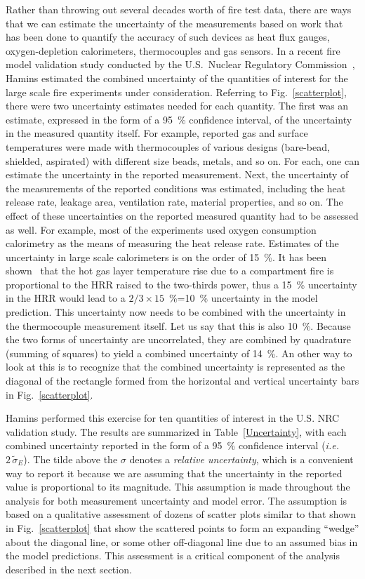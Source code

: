 Rather than throwing out several decades worth of fire test data, there are ways that we can estimate the uncertainty of the measurements based on work
that has been done to quantify the accuracy of such devices as heat flux gauges, oxygen-depletion calorimeters, thermocouples and gas sensors.
In a recent fire model validation study conducted by the U.S.~Nuclear Regulatory Commission~\cite{NUREG_1824}, Hamins estimated the combined
uncertainty of the quantities of interest for the large scale fire experiments under consideration. Referring to Fig.~\ref{scatterplot}, there were
two uncertainty estimates needed for each quantity. The first was an estimate, expressed in the form of a 95~\% confidence interval, of the
uncertainty in the measured quantity itself. For example, reported gas and surface temperatures were made with thermocouples of various designs (bare-bead,
shielded, aspirated) with different size beads, metals, and so on. For each, one can estimate the uncertainty in the reported measurement. Next, the
uncertainty of the measurements of the reported conditions was estimated, including the heat release rate, leakage area, ventilation rate, material
properties, and so on. The effect of these uncertainties on the reported measured quantity had to be assessed as well. For example, most of the
experiments used oxygen consumption calorimetry as the means of measuring the heat release rate.
Estimates of the uncertainty in large scale calorimeters is on the order of 15~\%. It has been shown~\cite{SFPE:Walton} that the hot gas layer temperature rise due to
a compartment fire is proportional to the HRR raised to the two-thirds power, thus a 15~\% uncertainty in the HRR would lead to a $2/3 \times 15$~\%=10~\%
uncertainty in the model prediction. This uncertainty now needs to be combined with the uncertainty in the thermocouple measurement itself. Let us say that
this is also 10~\%. Because the two forms of uncertainty are uncorrelated, they are combined by quadrature (summing of squares) to yield a combined
uncertainty of 14~\%. An other way to look at this is to recognize that the combined uncertainty is represented as the diagonal of the rectangle formed
from the horizontal and vertical uncertainty bars in Fig.~\ref{scatterplot}.

Hamins performed this exercise for ten quantities of interest in the U.S. NRC validation study. The results are summarized in Table~\ref{Uncertainty}, with
each combined uncertainty reported in the form of a 95~\% confidence interval ({\em i.e.} $2 \, \tilde{\sigma}_E$). The tilde above the $\sigma$ denotes a
{\em relative uncertainty}, which is a convenient way to report it because we are assuming that the uncertainty in the reported value is proportional to
its magnitude. This assumption is made throughout the analysis for both measurement uncertainty and model error. The assumption is based on a
qualitative assessment of dozens of scatter plots similar to that shown in Fig.~\ref{scatterplot} that show the scattered points to form an expanding ``wedge''
about the diagonal line, or some other off-diagonal line due to an assumed bias in the model predictions. This assessment is a critical component of the
analysis described in the next section.

